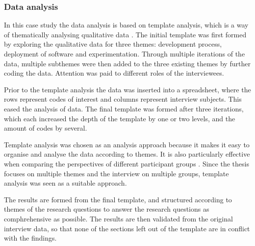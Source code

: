 \documentclass[english]{tktltiki2}
\theoremstyle{definition}
\theoremstyle{remark}
\begin{document}
\subsubsection{Data analysis} %
In this case study the data analysis is based on template analysis, which is a way of thematically analysing qualitative data \cite{king1998template}. The initial template was first formed by exploring the qualitative data for three themes: development process, deployment of software and experimentation. Through multiple iterations of the data, multiple subthemes were then added to the three existing themes by further coding the data. Attention was paid to different roles of the interviewees.

Prior to the template analysis the data was inserted into a spreadsheet, where the rows represent codes of interest and columns represent interview subjects. This eased the analysis of data. The final template was formed after three iterations, which each increased the depth of the template by one or two levels, and the amount of codes by several.  

Template analysis was chosen as an analysis approach because it makes it easy to organise and analyse the data according to themes. It is also particularly effective when comparing the perspectives of different participant groups \cite{king2004using}. Since the thesis focuses on multiple themes and the interview on multiple groups, template analysis was seen as a suitable approach.

The results are formed from the final template, and structured according to themes of the research questions to answer the research questions as comphrehensive as possible. The results are then validated from the original interview data, so that none of the sections left out of the template are in conflict with the findings.

\end{document}
